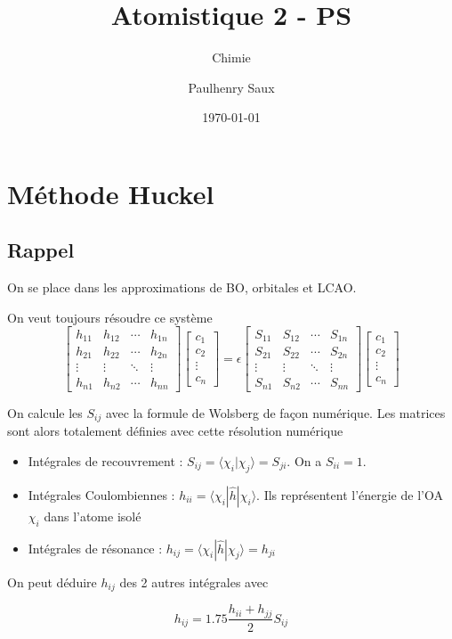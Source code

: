 \documentclass[french]{yLectureNote}
\title{Atomistique 2 - PS}
\subtitle{Chimie}
\author{Paulhenry Saux}
\date{\today}
\begin{document}
\setcounter{chapter}{2}
\chapter{Méthode Huckel}
\section{Rappel}
On se place dans les approximations de BO, orbitales et LCAO.

On veut toujours résoudre ce système
\[
\begin{bmatrix}
h_{11} & h_{12} & \cdots & h_{1n} \\
h_{21} & h_{22} & \cdots & h_{2n} \\
\vdots & \vdots & \ddots & \vdots \\
h_{n1} & h_{n2} & \cdots & h_{nn}
\end{bmatrix}
\begin{bmatrix}
c_1 \\
c_2 \\
\vdots \\
c_n
\end{bmatrix}
= \epsilon
\begin{bmatrix}
S_{11} & S_{12} & \cdots & S_{1n} \\
S_{21} & S_{22} & \cdots & S_{2n} \\
\vdots & \vdots & \ddots & \vdots \\
S_{n1} & S_{n2} & \cdots & S_{nn}
\end{bmatrix}
\begin{bmatrix}
c_1 \\
c_2 \\
\vdots \\
c_n
\end{bmatrix}
\]

On calcule les \(S_{ij}\) avec la formule de Wolsberg de façon numérique. Les matrices sont alors totalement définies avec cette résolution numérique

\begin{definition}
\begin{itemize}
 \item Intégrales de recouvrement : \(S_{ij} = \langle\chi_i|\chi_j\rangle = S_{ji}\). On a \(S_{ii} = 1\).
 \item Intégrales Coulombiennes : \(h_{ii} = \langle\chi_i|\hat{h}|\chi_i\rangle\). Ils représentent l'énergie de l'OA \(\chi_i\) dans l'atome isolé
 \item Intégrales de résonance : \(h_{ij} = \langle\chi_i|\hat{h}|\chi_j\rangle = h_{ji}\)
\end{itemize}
\end{definition}
On peut déduire \(h_{ij}\) des 2 autres intégrales avec
\begin{theorem}
 \[h_{ij} = 1.75\frac{h_{ii}+h_{jj}}{2}S_{ij}\]
\end{theorem}
\end{document}
